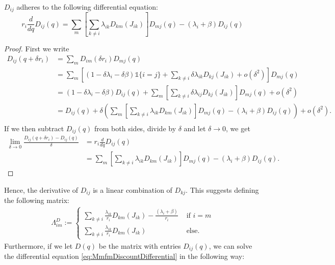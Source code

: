 \begin{lemma}
	$D_{ij}$ adheres to the following differential equation:
	\begin{equation}\label{eq:MmfmDiscountDifferential}
	r_i\frac{d}{dq}D_{ij}(q)=\sum\limits_m\left[\sum\limits_{k\neq i}\lambda_{ik}D_{km}(J_{ik})\right] D_{mj}(q)-(\lambda_i+\beta)D_{ij}(q)
	\end{equation}
	\begin{proof}
		First we write
		\[
		\begin{split}
		D_{ij}(q+\delta r_i)&=\sum_mD_{im}(\delta r_i)D_{mj}(q)\\
		&=\sum\limits_m\left[(1-\delta\lambda_i-\delta\beta)\mathds{1}\{i=j\}+\sum\limits_{k\neq i}\delta\lambda_{ik}D_{kj}(J_{ik})+o(\delta^2)\right]D_{mj}(q)\\
		&=(1-\delta\lambda_i-\delta\beta)D_{ij}(q)+\sum\limits_m\left[\sum\limits_{k\neq i}\delta\lambda_{ij}D_{kj}(J_{ik})\right]D_{mj}(q)+o(\delta^2)\\
		&=D_{ij}(q)+\delta\left( \sum\limits_m\left[\sum\limits_{k\neq i}\lambda_{ik}D_{km}(J_{ik})\right] D_{mj}(q)-(\lambda_i+\beta)D_{ij}(q) \right)+o(\delta^2).\\
		\end{split}
		\]
		If we then subtract $D_{ij}(q)$ from both sides, divide by $\delta$ and let $\delta\rightarrow 0$, we get
		\[
		\begin{split}
		\lim\limits_{\delta\rightarrow 0}\frac{D_{ij}(q+\delta r_i)-D_{ij}(q)}{\delta}&=r_i\frac{d}{dq}D_{ij}(q)\\
		&=\sum\limits_m\left[\sum\limits_{k\neq i}\lambda_{ik}D_{km}(J_{ik})\right] D_{mj}(q)-(\lambda_i+\beta)D_{ij}(q).
		\end{split}
		\]
	\end{proof}
\end{lemma}
Hence, the derivative of $D_{ij}$ is a linear combination of $D_{kj}$.
This suggests defining the following matrix:
\begin{equation}\label{eq:MmfmDiscountGenerator}
\begin{split}
\Lambda^D_{im}:=\begin{cases}
\sum\limits_{k\neq i}\frac{\lambda_{ik}}{r_i}D_{km}(J_{ik})-\frac{(\lambda_i+\beta)}{r_i}&\text{ if }i=m\\
\sum\limits_{k\neq i}\frac{\lambda_{ik}}{r_i}D_{km}(J_{ik})&\text{ else.}
\end{cases}
\end{split}
\end{equation}
Furthermore, if we let $D(q)$ be the matrix with entries $D_{ij}(q)$, we can solve the differential equation \eqref{eq:MmfmDiscountDifferential} in the following way:
